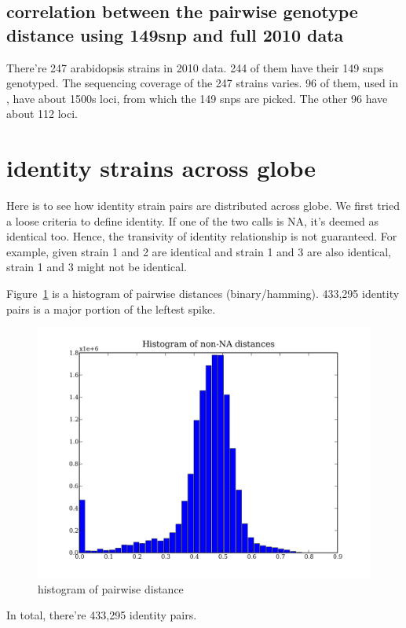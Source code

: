 \documentclass[a4paper,10pt]{article}
\begin{document}
\subsection{correlation between the pairwise genotype distance using 149snp and full 2010 data}
There're 247 arabidopsis strains in 2010 data. 244 of them have their 149 snps genotyped. The sequencing coverage of the 247 strains varies. 96 of them, used in \cite{Nordborg2005}, have about 1500s loci, from which the 149 snps are picked. The other 96 have about 112 loci.

\section{identity strains across globe}
Here is to see how identity strain pairs are distributed across globe. We first tried a loose criteria to define identity. If one of the two calls is NA, it's deemed as identical too. Hence, the transivity of identity relationship is not guaranteed. For example, given strain 1 and 2 are identical and strain 1 and 3 are also identical, strain 1 and 3 might not be identical.

Figure~\ref{f29} is a histogram of pairwise distances (binary/hamming). 433,295 identity pairs is a major portion of the leftest spike.

\begin{figure}
\includegraphics[width=1\textwidth]{figures/data_d110_c0_5_distance_hist.png}
\caption{histogram of pairwise distance}\label{f29}
\end{figure}

In total, there're 433,295 identity pairs.
\end{document}
